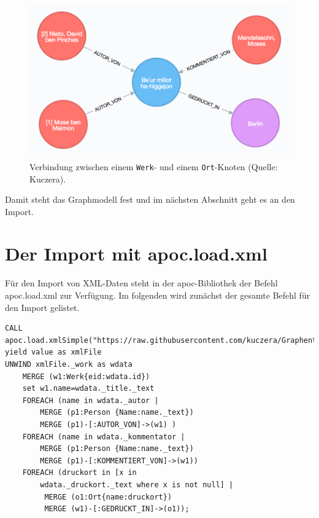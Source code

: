 \documentclass[ngerman,]{scrreprt}
\begin{document}
\begin{figure}
\centering
\includegraphics{Bilder/Werk-gesamt.png}
\caption{Verbindung zwischen einem \texttt{Werk}- und einem \texttt{Ort}-Knoten (Quelle: Kuczera).}
\end{figure}

Damit steht das Graphmodell fest und im nächsten Abschnitt geht es an den Import.

\section{Der Import mit apoc.load.xml}\label{der-import-mit-apoc.load.xml}

Für den Import von XML-Daten steht in der apoc-Bibliothek der Befehl apoc.load.xml zur Verfügung. Im folgenden wird zunächst der gesamte Befehl für den Import gelistet.

\begin{verbatim}
CALL apoc.load.xmlSimple("https://raw.githubusercontent.com/kuczera/Graphentechnologien/master/docs/data/kollatz.xml") yield value as xmlFile
UNWIND xmlFile._work as wdata
    MERGE (w1:Werk{eid:wdata.id})
    set w1.name=wdata._title._text
    FOREACH (name in wdata._autor |
        MERGE (p1:Person {Name:name._text})
        MERGE (p1)-[:AUTOR_VON]->(w1) )
    FOREACH (name in wdata._kommentator |
        MERGE (p1:Person {Name:name._text})
        MERGE (p1)-[:KOMMENTIERT_VON]->(w1))
    FOREACH (druckort in [x in
        wdata._druckort._text where x is not null] |
         MERGE (o1:Ort{name:druckort})
         MERGE (w1)-[:GEDRUCKT_IN]->(o1));
\end{verbatim}
\end{document}
